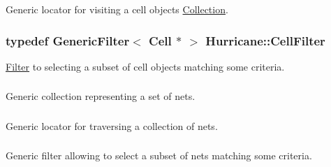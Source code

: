 Generic locator for visiting a cell objects \hyperlink{classHurricane_1_1Collection}{Collection}. \hypertarget{namespaceHurricane_addb0e9cd376680ecea4966516694b799}{
\subsubsection[{Cell\-Filter}]{\setlength{\rightskip}{0pt plus 5cm}typedef {\bf Generic\-Filter}$<$ {\bf Cell} $\ast$ $>$ {\bf Hurricane\-::\-Cell\-Filter}}}\label{namespaceHurricane_addb0e9cd376680ecea4966516694b799}
\hyperlink{classHurricane_1_1Filter}{Filter} to selecting a subset of cell objects matching some criteria. \hypertarget{namespaceHurricane_a3404a8b17130a1824f4a281704b04df7}{
\subsubsection[{Nets}]{}}\label{namespaceHurricane_a3404a8b17130a1824f4a281704b04df7}
Generic collection representing a set of nets. \hypertarget{namespaceHurricane_a2911512d442f8332c3cd3a135332cc02}{
\subsubsection[{Net\-Locator}]{}}\label{namespaceHurricane_a2911512d442f8332c3cd3a135332cc02}
Generic locator for traversing a collection of nets. \hypertarget{namespaceHurricane_a0dfd2c5b40325a919d139091312732e9}{
\subsubsection[{Net\-Filter}]{}}\label{namespaceHurricane_a0dfd2c5b40325a919d139091312732e9}
Generic filter allowing to select a subset of nets matching some criteria. \hypertarget{namespaceHurricane_a4456a34f3bc6766d471c3064ace19759}{
\subsubsection[{Gos}]{}}\label{namespaceHurricane_a4456a34f3bc6766d471c3064ace19759}
